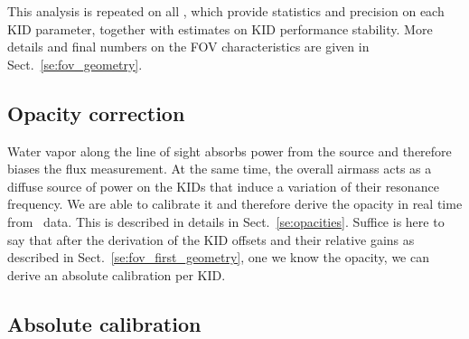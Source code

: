 
This analysis is repeated on all \bms, which provide statistics and
precision on each KID parameter, together with estimates on KID performance
stability. More details and final numbers on the FOV characteristics are given
in Sect.~\ref{se:fov_geometry}.

\subsection{Opacity correction}

Water vapor along the line of sight absorbs power from the source and therefore
biases the flux measurement. At the same time, the overall airmass acts as a
diffuse source of power on the KIDs that induce a variation of their resonance
frequency. We are able to calibrate it and therefore derive the opacity in real
time from \nika\ data. This is described in details in
Sect.~\ref{se:opacities}. Suffice is here to say that after the derivation of
the KID offsets and their relative gains as described in
Sect.~\ref{se:fov_first_geometry}, one we know the opacity, we can derive an
absolute calibration per KID.

\subsection{Absolute calibration}

